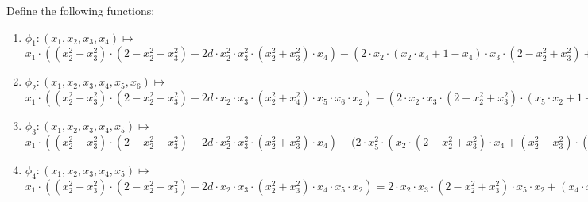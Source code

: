 Define the following functions:
\begin{enumerate}
	\item $\phi_1: (x_1, x_2, x_3, x_4) \mapsto $ \\
				$x_1 \cdot ((x_2^2 - x_3^2) \cdot (2 - x_2^2 + x_3^2)
				+ 2d \cdot x_2^2 \cdot x_3^2 \cdot (x_2^2 + x_3^2) \cdot x_4) 
				- (2 \cdot x_2 \cdot (x_2 \cdot x_4 + 1 - x_4) \cdot x_3 
				\cdot (2 - x_2^2 + x_3^2) + x_3 \cdot (x_2^2
				+ x_3^2) \cdot (x_2^2 - x_3^2)\cdot x_4)$
	\item $\phi_2: (x_1, x_2, x_3, x_4, x_5, x_6) \mapsto $ \\
				$x_1 \cdot ((x_2^2 - x_3^2) \cdot (2 - x_2^2 + x_3^2) 
					+ 2d \cdot x_2 \cdot x_3 \cdot (x_2^2 + x_4^2) \cdot x_5 \cdot x_6 \cdot x_2) 
					- (2 \cdot x_2 \cdot x_3 \cdot (2 - x_2^2 + x_3^2) 
					\cdot (x_5 \cdot x_2 + 1 - x_2) + x_3 \cdot (x_2^2 
					+ x_3^2) \cdot (x_2^2 - x_3^2) \cdot x_6 \cdot x_2)$
	\item $\phi_3: (x_1, x_2, x_3, x_4, x_5) \mapsto $ \\
				$x_1 \cdot ((x_2^2 - x_3^2) \cdot (2 - x_2^2 - x_3^2) 
				+ 2d \cdot x_2^2 \cdot x_3^2 \cdot (x_2^2 + x_3^2) \cdot x_4) 
				- (2 \cdot x_5^2 \cdot (x_2 \cdot (2 - x_2^2 + x_3^2) \cdot x_4 
				+ (x_2^2 - x_3^2)\cdot (x_2^2 + x_3^2) \cdot (x_2 \cdot x_4 + 1 - x_4))$
	\item $\phi_4: (x_1, x_2, x_3, x_4, x_5) \mapsto $ \\
				$x_1 \cdot ((x_2^2 - x_3^2) \cdot (2 - x_2^2 + x_3^2) + 2d \cdot x_2 \cdot x_3 \cdot (x_2^2 + x_3^2) \cdot x_4 \cdot x_5 \cdot x_2) = 
2 \cdot x_2 \cdot x_3 \cdot (2 - x_2^2 + x_3^2) \cdot x_5 \cdot x_2  
+  (x_4 \cdot x_2 + 1 - x_2) \cdot (x_2^2 + x_3^2) \cdot (x_2^2 - x_3^2) $
\end{enumerate}

